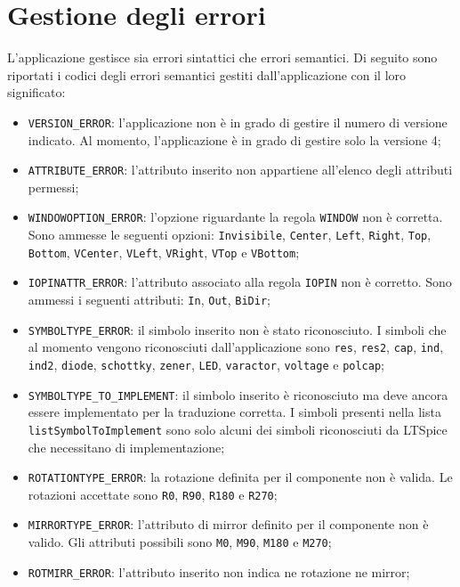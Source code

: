 \section{Gestione degli errori}
L'applicazione gestisce sia errori sintattici che errori semantici. Di seguito sono riportati i codici degli errori semantici gestiti dall'applicazione con il loro significato:
\begin{itemize}
	\item \texttt{VERSION\_ERROR}: l'applicazione non è in grado di gestire il numero di versione indicato. Al momento, l'applicazione è in grado di gestire solo la versione 4;
	\item \texttt{ATTRIBUTE\_ERROR}: l'attributo inserito non appartiene all'elenco degli attributi permessi;
	\item \texttt{WINDOWOPTION\_ERROR}: l'opzione riguardante la regola \texttt{WINDOW} non è corretta. Sono ammesse le seguenti opzioni: \texttt{Invisibile}, \texttt{Center}, \texttt{Left}, \texttt{Right}, \texttt{Top}, \texttt{Bottom}, \texttt{VCenter}, \texttt{VLeft}, \texttt{VRight}, \texttt{VTop} e \texttt{VBottom};
	\item \texttt{IOPINATTR\_ERROR}: l'attributo associato alla regola \texttt{IOPIN} non è corretto. Sono ammessi i seguenti attributi: \texttt{In}, \texttt{Out}, \texttt{BiDir};
	\item \texttt{SYMBOLTYPE\_ERROR}: il simbolo inserito non è stato riconosciuto. I simboli che al momento vengono riconosciuti dall'applicazione sono \texttt{res}, \texttt{res2}, \texttt{cap}, \texttt{ind}, \texttt{ind2}, \texttt{diode}, \texttt{schottky}, \texttt{zener},  \texttt{LED}, \texttt{varactor}, \texttt{voltage} e \texttt{polcap};
	\item \texttt{SYMBOLTYPE\_TO\_IMPLEMENT}: il simbolo inserito è riconosciuto ma deve ancora essere implementato per la traduzione corretta. I simboli presenti nella lista \texttt{listSymbolToImplement} sono solo alcuni dei simboli riconosciuti da LTSpice che necessitano di implementazione;
	\item \texttt{ROTATIONTYPE\_ERROR}: la rotazione definita per il componente non è valida. Le rotazioni accettate sono \texttt{R0}, \texttt{R90}, \texttt{R180} e \texttt{R270};
	\item \texttt{MIRRORTYPE\_ERROR}: l'attributo di mirror definito per il componente non è valido. Gli attributi possibili sono \texttt{M0}, \texttt{M90}, \texttt{M180} e \texttt{M270};
	\item \texttt{ROTMIRR\_ERROR}: l'attributo inserito non indica ne rotazione ne mirror;

\end{itemize}

